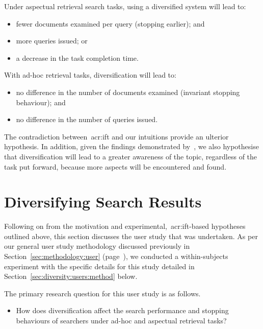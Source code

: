 Under aspectual retrieval search tasks, using a diversified system will lead to:
\begin{itemize}
    \item{ fewer documents examined per query (stopping earlier); and}
    \item{ more queries issued; or}
    \item{ a decrease in the task completion time.}
\end{itemize}

With ad-hoc retrieval tasks, diversification will lead to:
\begin{itemize}
    \item{ no difference in the number of documents examined (invariant stopping behaviour); and}
    \item{ no difference in the number of queries issued.}
\end{itemize}

The contradiction between~\gls{acr:ift} and our intuitions provide an ulterior hypothesis. In addition, given the findings demonstrated by~\cite{syed2017sal}, we also hypothesise that diversification will lead to a greater awareness of the topic, regardless of the task put forward, because more aspects will be encountered and found.

\section{Diversifying Search Results}\label{sec:diversity:users}
Following on from the motivation and experimental,~\gls{acr:ift}-based hypotheses outlined above, this section discusses the user study that was undertaken. As per our general user study methodology discussed previously in Section~\ref{sec:methodology:user} (page~\pageref{sec:methodology:user}), we conducted a within-subjects experiment with the specific details for this study detailed in Section~\ref{sec:diversity:users:method} below.

The primary research question for this user study is as follows.

\begin{itemize}
    \item{ How does diversification affect the search performance and stopping behaviours of searchers under ad-hoc and aspectual retrieval tasks?}
\end{itemize}

